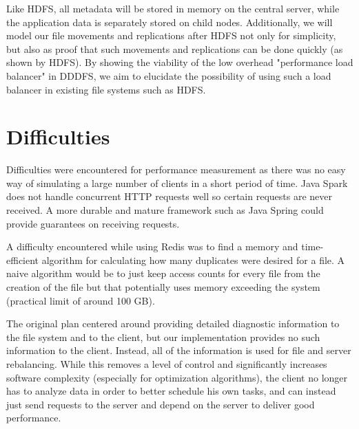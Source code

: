 \documentclass[twoside]{article}
\begin{document}
\begin{multicols}{2}
Like HDFS, all metadata will be stored in memory on the central server, while the application data is separately stored on child nodes. Additionally, we will model our file movements and replications after HDFS not only for simplicity, but also as proof that such movements and replications can be done quickly (as shown by HDFS). By showing the viability of the low overhead "performance load balancer" in DDDFS, we aim to elucidate the possibility of using such a load balancer in existing file systems such as HDFS.

\section{Difficulties}
Difficulties were encountered for performance measurement as there was no easy way of simulating a large number of clients in a short period of time. Java Spark does not handle concurrent HTTP requests well so certain requests are never received. A more durable and mature framework such as Java Spring could provide guarantees on receiving requests. 

A difficulty encountered while using Redis was to find a memory and time-efficient algorithm for calculating how many duplicates were desired for a file. A naive algorithm would be to just keep access counts for every file from the creation of the file but that potentially uses memory exceeding the system (practical limit of around 100 GB).

The original plan centered around providing detailed diagnostic information to the file system and to the client, but our implementation provides no such information to the client. Instead, all of the information is used for file and server rebalancing. While this removes a level of control and significantly increases software complexity (especially for optimization algorithms), the client no longer has to analyze data in order to better schedule his own tasks, and can instead just send requests to the server and depend on the server to deliver good performance.



\end{multicols}
\end{document}

